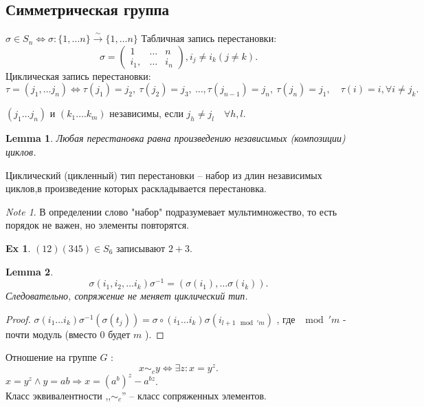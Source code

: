 \documentclass[11pt]{book}
\theoremstyle{definition}
\theoremstyle{plain}
\theoremstyle{plain}
\newtheorem*{lm}{Lemma}
\theoremstyle{definition}
\newtheorem*{ex}{Ex}
\theoremstyle{remark}
\newtheorem*{note}{Note}
\begin{document}
\subsection{Симметрическая группа}
\begin{defn}[Перестановка]
    $\sigma \in  S_n \Longleftrightarrow \sigma : \{1, \ldots n \} \stackrel{\sim} \to  \{1, \ldots n\}$
    Табличная запись перестановки:
    \[
    \sigma  = \left ( 
    \begin{array}{ccc}
	1 &\ldots& n \\
	i_1, & \ldots  & i_n 
    \end{array}
\right ), i_j \ne i_k (j \ne k)
    .\] 
    Циклическая запись перестановки:
    \[
	\tau = (j_1, \ldots j_n) \Longleftrightarrow 
	\tau(j_1) = j_2, ~ \tau(j_2) = j_3, ~ \ldots , \tau(j_{n-1}) = j_n, ~ \tau(j_n) = j_1, \quad \tau(i) = i, \forall i \ne j_k
    .\] 
\end{defn}
\begin{defn}
    $(j_1 \ldots j_n)$ и $(k_1 \ldots .k_m)$ независимы, если $j_h \ne j_l \quad \forall h, l$.
\end{defn}
\begin{lm}
    Любая перестановка равна произведению независимых (композиции) циклов.
\end{lm}
\begin{defn}
    Циклический (цикленный) тип перестановки -- набор из длин независимых циклов,в произведение которых раскладывается перестановка.
\end{defn}
\begin{note}
    В определении слово "набор" подразумевает мультимножество, то есть порядок не важен, но элементы повторятся.
\end{note}
\begin{ex}
    $(12) (345) \in  S_6$ записывают $2 + 3$.
\end{ex}
\begin{lm}\label{lm_sim_group_1}
    \[
	\sigma (i_1, i_2, \ldots i_k) \sigma ^{-1} = ( \sigma (i_1), \ldots \sigma (i_k))
    .\] 
    Следовательно, сопряжение не меняет циклический тип.
\end{lm}
\begin{proof}
    $\sigma (i_1 \ldots i_k) \sigma ^{-1} (\sigma (t_j))=  \sigma \circ (i_1 \ldots i_k) \sigma  (i_{l+1 \mod' m})$
    , где $\mod' m$ - почти модуль (вместо 0 будет $m$ ).
\end{proof}
\begin{defn}
    Отношение на группе $G$ :
    \[
    x \sim_c y \Leftrightarrow \exists z: x = y^z
    .\] 
    $x=y^z \wedge y=ab \Rightarrow x = (a^b)^z - a^{bz}$.\\
    Класс эквивалентности ,,$\sim_{c}$'' -- класс сопряженных элементов.
\end{defn}
\end{document}

